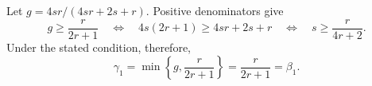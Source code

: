 Let \(g=4sr/(4sr+2s+r)\).  Positive denominators give
\[
g\geq\frac{r}{2r+1}
\quad\Longleftrightarrow\quad
4s(2r+1)\geq4sr+2s+r
\quad\Longleftrightarrow\quad
s\geq\frac{r}{4r+2}.
\]
Under the stated condition, therefore,
\[
\gamma_1=\min\left\{g,\frac{r}{2r+1}\right\}
=\frac{r}{2r+1}=\beta_1.
\]